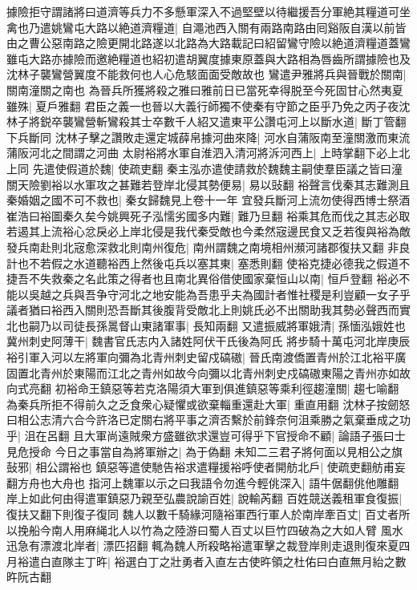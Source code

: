 據險拒守謂諸將曰道濟等兵力不多懸軍深入不過堅壁以待繼援吾分軍絶其糧道可坐禽也乃遣姚鸞屯大路以絶道濟糧道|{
	自澠池西入關有兩路南路由囘谿阪自漢以前皆由之曹公惡南路之險更開北路遂以北路為大路載記曰紹留鸞守險以絶道濟糧道蓋鸞雖屯大路亦據險而邀絶糧道也紹初遣胡翼度據東原蓋與大路相為唇齒所謂據險也及沈林子襲鸞營翼度不能救何也人心危駭面面受敵故也}
鸞遣尹雅將兵與晉戰於關南|{
	關南潼關之南也}
為晉兵所獲將殺之雅曰雅前日已當死幸得脱至今死固甘心然夷夏雖殊|{
	夏戶雅翻}
君臣之義一也晉以大義行師獨不使秦有守節之臣乎乃免之丙子夜沈林子將鋭卒襲鸞營斬鸞殺其士卒數千人紹又遣東平公讚屯河上以斷水道|{
	斷丁管翻下兵斷同}
沈林子擊之讚敗走還定城薛帛據河曲來降|{
	河水自蒲阪南至潼關激而東流蒲阪河北之間謂之河曲}
太尉裕將水軍自淮泗入清河將泝河西上|{
	上時掌翻下必上北上同}
先遣使假道於魏|{
	使疏吏翻}
秦主泓亦遣使請救於魏魏主嗣使羣臣議之皆曰潼關天險劉裕以水軍攻之甚難若登岸北侵其勢便易|{
	易以䜴翻}
裕聲言伐秦其志難測且秦婚姻之國不可不救也|{
	秦女歸魏見上卷十一年}
宜發兵斷河上流勿使得西博士祭酒崔浩曰裕圖秦久矣今姚興死子泓懦劣國多内難|{
	難乃旦翻}
裕乘其危而伐之其志必取若遏其上流裕心忿戾必上岸北侵是我代秦受敵也今柔然宼邊民食又乏若復與裕為敵發兵南赴則北宼愈深救北則南州復危|{
	南州謂魏之南境相州瀕河諸郡復扶又翻}
非良計也不若假之水道聽裕西上然後屯兵以塞其東|{
	塞悉則翻}
使裕克捷必德我之假道不捷吾不失救秦之名此策之得者也且南北異俗借使國家棄恒山以南|{
	恒戶登翻}
裕必不能以吳越之兵與吾争守河北之地安能為吾患乎夫為國計者惟社稷是利豈顧一女子乎議者猶曰裕西入關則恐吾斷其後腹背受敵北上則姚氏必不出關助我其勢必聲西而實北也嗣乃以司徒長孫暠督山東諸軍事|{
	長知兩翻}
又遣振威將軍娥清|{
	孫愐泓娥姓也}
冀州刺史阿薄干|{
	魏書官氏志内入諸姓阿伏干氏後為阿氏}
將步騎十萬屯河北岸庚辰裕引軍入河以左將軍向彌為北青州刺史留戍碻磝|{
	晉氏南渡僑置青州於江北裕平廣固置北青州於東陽而江北之青州如故今向彌以北青州刺史戍碻磝東陽之青州亦如故向式亮翻}
初裕命王鎮惡等若克洛陽須大軍到俱進鎮惡等乘利徑趨潼關|{
	趨七喻翻}
為秦兵所拒不得前久之乏食衆心疑懼或欲棄輜重還赴大軍|{
	重直用翻}
沈林子按劒怒曰相公志清六合今許洛已定關右將平事之濟否繫於前鋒奈何沮乘勝之氣棄垂成之功乎|{
	沮在呂翻}
且大軍尚遠賊衆方盛雖欲求還豈可得乎下官授命不顧|{
	論語子張曰士見危授命}
今日之事當自為將軍辦之|{
	為于偽翻}
未知二三君子將何面以見相公之旗鼔邪|{
	相公謂裕也}
鎮惡等遣使馳告裕求遣糧援裕呼使者開舫北戶|{
	使疏吏翻舫甫妄翻方舟也大舟也}
指河上魏軍以示之曰我語令勿進今輕佻深入|{
	語牛倨翻佻他雕翻}
岸上如此何由得遣軍鎮惡乃親至弘農說諭百姓|{
	說輸芮翻}
百姓競送義租軍食復振|{
	復扶又翻下則復子復同}
魏人以數千騎緣河隨裕軍西行軍人於南岸牽百丈|{
	百丈者所以挽船今南人用麻䋲北人以竹為之陸游曰蜀人百丈以巨竹四破為之大如人臂}
風水迅急有漂渡北岸者|{
	漂匹招翻}
輒為魏人所殺略裕遣軍擊之裁登岸則走退則復來夏四月裕遣白直隊主丁旿|{
	裕選白丁之壯勇者入直左古使旿領之杜佑曰白直無月紿之數旿阮古翻}
